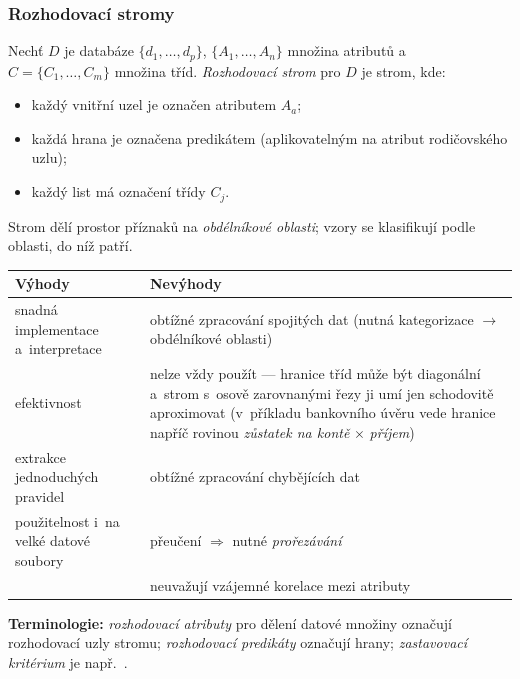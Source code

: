 \documentclass[11pt,a4paper]{article}
\theoremstyle{definition}
\begin{document}
\subsubsection{Rozhodovací stromy}

\begin{defbox}
Nechť $D$ je databáze $\{d_1,\dots,d_p\}$, $\{A_1,\dots,A_n\}$ množina atributů
a~$C=\{C_1,\dots,C_m\}$ množina tříd. \emph{Rozhodovací strom} pro $D$ je strom, kde:
\begin{itemize}
\item každý vnitřní uzel je označen atributem $A_a$;
\item každá hrana je označena predikátem (aplikovatelným na atribut rodičovského uzlu);
\item každý list má označení třídy $C_j$.
\end{itemize}
Strom dělí prostor příznaků na \emph{obdélníkové oblasti}; vzory se klasifikují podle
oblasti, do níž patří.
\end{defbox}

\begin{center}
\small
\begin{tabular}{@{}p{7.4cm}p{8.2cm}@{}}
\toprule
\textbf{Výhody} & \textbf{Nevýhody} \\
\midrule
snadná implementace a~interpretace & obtížné zpracování spojitých dat (nutná kategorizace
  $\to$ obdélníkové oblasti) \\
efektivnost & nelze vždy použít --- hranice tříd může být diagonální a~strom s~osově
  zarovnanými řezy ji umí jen schodovitě aproximovat (v~příkladu bankovního úvěru vede
  hranice napříč rovinou \emph{zůstatek na kontě} $\times$ \emph{příjem}) \\
extrakce jednoduchých pravidel & obtížné zpracování chybějících dat \\
použitelnost i~na velké datové soubory & přeučení $\Rightarrow$ nutné \emph{prořezávání} \\
  & neuvažují vzájemné korelace mezi atributy \\
\bottomrule
\end{tabular}
\end{center}

\textbf{Terminologie:} \emph{rozhodovací atributy} pro dělení datové množiny označují
rozhodovací uzly stromu; \emph{rozhodovací predikáty} označují hrany; \emph{zastavovací
kritérium} je např.\ .
\end{document}
